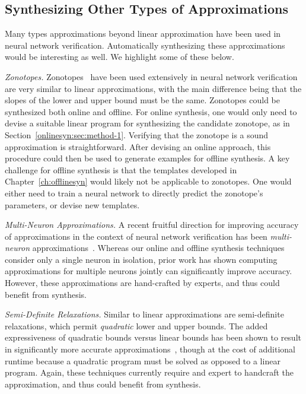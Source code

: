 \subsection{Synthesizing Other Types of Approximations}
Many types approximations beyond linear approximation have been used in
neural network verification. Automatically synthesizing these
approximations would be interesting as well. We highlight some of these
below.

\textit{Zonotopes.} Zonotopes~\cite{ziegler2012lectures} have been used
extensively in neural network
verification~\cite{singh2018fast,bonaert2021fast,muller2021effective} are
very similar to linear approximations, with the main difference being that
the slopes of
the lower and upper bound must be the same. Zonotopes could be synthesized
both online and offline. For online synthesis, one would only need to
devise a suitable linear program for synthesizing the candidate zonotope,
as in Section~\ref{onlinesyn:sec:method-1}. Verifying that the zonotope is
a sound approximation is straightforward. After devising an online
approach, this procedure could then be used to generate examples for
offline synthesis. A key challenge for offline synthesis is that the
templates developed in Chapter~\ref{ch:offlinesyn} would likely not be
applicable to zonotopes. One would either need to train a neural network to
directly predict the zonotope's parameters, or devise new templates.

\textit{Multi-Neuron Approximations.} A recent fruitful direction for
improving accuracy of approximations in the context of neural network
verification has been \textit{multi-neuron}
approximations~\cite{Singh2019krelu,muller2021prima}. Whereas our online
and offline synthesis techniques consider only a single neuron in
isolation, prior work has shown computing approximations for multiple
neurons jointly can significantly improve accuracy. However, these
approximations are hand-crafted by experts, and thus could benefit from
synthesis.

\textit{Semi-Definite Relaxations.} Similar to linear approximations are
semi-definite relaxations, which permit \textit{quadratic} lower and upper
bounds. The added expressiveness of quadratic bounds versus linear bounds
has been shown to result in significantly more accurate
approximations~\cite{dathathri2020enabling}, though at the cost of
additional runtime because a quadratic program must be solved as opposed to
a linear program. Again, these techniques currently require and expert to
handcraft the approximation, and thus could benefit from synthesis.



